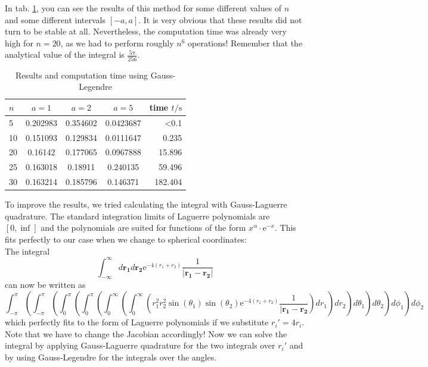 \documentclass[10pt,a4paper]{article}
\begin{document}
In tab. \ref{results_leg}, you can see the results of this method for some different values of $n$ and some different intervals $[-a,a]$. It is very obvious that these results did not turn to be stable at all. Nevertheless, the computation time was already very high for $n=20$, as we had to perform roughly $n^6$ operations! Remember that the analytical value of the integral is $\frac{5\pi}{256}$.
\begin{table}[h]
	\caption{Results and computation time using Gauss-Legendre\label{results_leg}}
	\centering
	\begin{tabular}{lcccr}
		$n$	&	$a=1$	&	$a=2$	&	$a=5$	&	time $t/\mathrm{s}$	\\\hline
		5	&	0.202983	&	0.354602	&	0.0423687	&	<0.1	\\
		10	&	0.151093	&	0.129834	&	0.0111647	&	0.235	\\
		20	&	0.16142	&	0.177065	&	0.0967888	&	15.896	\\
		25	&	0.163018	&	0.18911	&	0.240135	&	59.496	\\
		30	&	0.163214	&	0.185796	&	0.146371	&	182.404		
	\end{tabular}
\end{table}

To improve the results, we tried calculating the integral with Gauss-Laguerre quadrature. The standard integration limits of Laguerre polynomials are $[0,\inf]$ and the polynomials are suited for functions of the form $x^\alpha\cdot \mathrm{e}^{-x}$. This fits perfectly to our case when we change to spherical coordinates:\\
The integral
\begin{equation}
	\int_{-\infty}^{\infty} d\mathbf{r_1}d\mathbf{r_2}\mathrm{e}^{-4(r_1+r_2)}\frac{1}{|\mathbf{r_1}-\mathbf{r_2}|}
\end{equation}
can now be written as
\begin{equation}
	\int_{-\pi}^{\pi}\left(\int_{-\pi}^{\pi}\left(\int_{0}^{\pi}\left(\int_{0}^{\pi}\left(\int_{0}^{\infty}\left(\int_{0}^{\infty}\left(r_1^2r_2^2\sin(\theta_1)\sin(\theta_2)\mathrm{e}^{-4(r_1+r_2)}\frac{1}{|\mathbf{r_1}-\mathbf{r_2}}\right)dr_1\right)dr_2\right)d\theta_1\right)d\theta_2\right)d\phi_1\right)d\phi_2
\end{equation}
which perfectly fits to the form of Laguerre polynomials if we substitute $r_i'=4r_i$. Note that we have to change the Jacobian accordingly! Now we can solve the integral by applying Gauss-Laguerre quadrature for the two integrals over $r_i'$ and by using Gauss-Legendre for the integrals over the angles.
\end{document}
